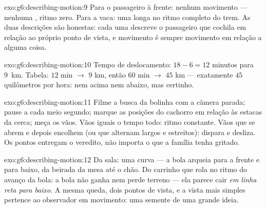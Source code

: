 \begin{solution}{exo:g6:describing-motion:9}
Para o passageiro à frente: nenhum movimento --- nenhuma ,
ritmo zero. Para a vaca: uma longa  no ritmo
completo do trem. As duas descrições são honestas: cada uma descreve
o passageiro que cochila em relação ao próprio ponto de vista, e
movimento é sempre movimento em relação a alguma coisa.
\end{solution}

\begin{solution}{exo:g6:describing-motion:10}
Tempo de deslocamento: $18 - 6 = 12$ minutos para \qty{9}{km}.
Tabela: $12$ min $\to$ $9$ km, então $60$ min $\to$ $45$ km ---
exatamente $45$ quilômetros por hora: nem acima nem abaixo, mas
certinho.
\end{solution}

\begin{solution}{exo:g6:describing-motion:11}
Filme a busca da bolinha com a câmera parada; pause a cada meio
segundo; marque as posições do cachorro em relação às estacas da
cerca; meça os vãos. Vãos iguais o tempo todo: ritmo constante. Vãos
que se abrem e depois encolhem (ou que alternam largos e estreitos):
dispara e desliza. Os pontos entregam o veredito, não importa o que a
família tenha gritado.
\end{solution}

\begin{solution}{exo:g6:describing-motion:12}
Da sala: uma curva --- a bola arqueia para a frente e para baixo, da
beirada da mesa até o chão. Do carrinho que rola no ritmo do avanço
da bola: a bola não ganha nem perde terreno --- ela parece cair
\emph{em linha reta para baixo}. A mesma queda, dois pontos de vista,
e a vista mais simples pertence ao observador em movimento: uma
semente de uma grande ideia.
\end{solution}

